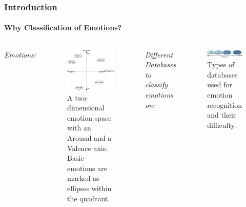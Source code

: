 \documentclass[10pt,usepdftitle=false,aspectratio=169]{beamer}
\begin{document}
\setlength{\figwidth}{.9\textwidth}
\setlength{\figheight}{.6\textheight}



\begin{frame}\frametitle{Introduction}
    \framesubtitle{Why Classification of Emotions?}
    
\begin{columns}
	
    
\emph{Emotions:}
\begin{figure}
	\includegraphics[width=.7\textwidth]{figures/2DemotionMapping.pdf}	
	\caption{A two-dimensional emotion space with an Arousal and a Valence axis. Basic emotions are marked as ellipses within the quadrant. }

\end{figure}
   
\vspace{2em}
\vspace{1em}
	\emph{Different Databases to classify emotions on:}
	\vspace{1em}
	\begin{figure}
		\includegraphics[width=1.0\textwidth]{figures/differentDatabases.pdf}	
		\caption{Types of databases used for emotion recognition and their difficulty.}
	\end{figure}


	
	\end{columns}
\end{frame}
\end{document}
